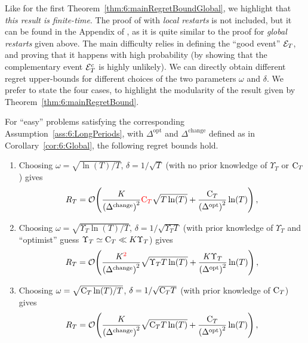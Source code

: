 Like for the first Theorem~\ref{thm:6:mainRegretBoundGlobal},
we highlight that \emph{this result is finite-time}.
The proof of \GLRklUCB{} with \emph{local restarts} is not included, but it can be found in the Appendix of \cite{Besson2019GLRT}, as it is quite similar to the proof for \emph{global restarts} given above. The main difficulty relies in defining the ``good event'' $\mathcal{E}_T$, and proving that it happens with high probability (by showing that the complementary event $\mathcal{E}_T^c$ is highly unlikely).
%
We can directly obtain different regret upper-bounds for different choices of the two parameters $\omega$ and $\delta$.
We prefer to state the four cases, to highlight the modularity of the result given by Theorem~\ref{thm:6:mainRegretBound}.

\begin{corollary}\label{cor:6:Local}
    For ``easy'' problems satisfying the corresponding Assumption~\ref{ass:6:LongPeriods},
    with $\Delta^{\text{opt}}$ and ${\Delta}^{\text{change}}$ defined as in Corollary~\ref{cor:6:Global}, the following regret bounds hold.

    \begin{enumerate}
        \item Choosing $\omega = \sqrt{\ln(T) / T}$, $\delta = 1 / \sqrt{T}$ (with no prior knowledge of $\Upsilon_T$ or $\mathrm{C}_T$) gives
        \begin{equation}
            R_T = \mathop{}\mathopen{}\mathcal{O}\mathopen{}\left(\frac{K}{\left(\Delta^{\text{change}}\right)^2} \textcolor{red}{\mathrm{C}_T}\sqrt{T\ln(T)} + \frac{\mathrm{C}_T}{\left(\Delta^{\text{opt}}\right)^2} \ln(T)\right),
        \end{equation}

        \item Choosing $\omega = \sqrt{\Upsilon_T\ln(T) / T}$, $\delta = 1 / \sqrt{\Upsilon_T T}$ (with prior knowledge of $\Upsilon_T$ and ``optimist'' guess $\Upsilon_T \simeq \mathrm{C}_T \ll K \Upsilon_T$) gives
        \begin{equation}
            R_T = \mathop{}\mathopen{}\mathcal{O}\mathopen{}\left(\frac{K^{\textcolor{red}{2}}}{\left({\Delta}^{\text{change}}\right)^2}\sqrt{\Upsilon_T T\ln(T)} + \frac{K\Upsilon_T}{\left(\Delta^{\text{opt}}\right)^2}\ln(T)\right),
        \end{equation}

        \item Choosing $\omega = \sqrt{\mathrm{C}_T\ln(T) / T}$, $\delta = 1 / \sqrt{\mathrm{C}_T T}$ (with prior knowledge of $\mathrm{C}_T$) gives
        \begin{equation}
            R_T = \mathop{}\mathopen{}\mathcal{O}\mathopen{}\left(\frac{K}{\left({\Delta}^{\text{change}}\right)^2}\sqrt{\mathrm{C}_T T\ln(T)} + \frac{\mathrm{C}_T}{\left(\Delta^{\text{opt}}\right)^2}\ln(T)\right),
        \end{equation}


\end{enumerate}
\end{corollary}
